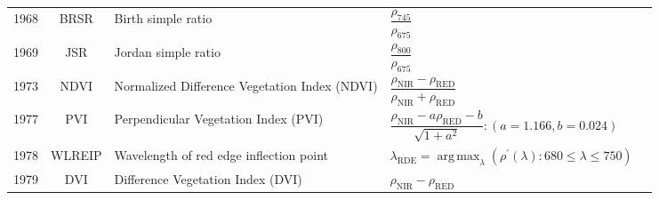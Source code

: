 \documentclass[10pt]{article}
\DeclareMathOperator{\argmax}{arg\,max}
\begin{document}
\begin{ThreePartTable}
\begin{longtable}{c c m{2.80in} M{2.80in} M{1.5in}}
  1968 & BRSR    & Birth simple ratio                                                             & $\dfrac{\rho_{745}}{\rho_{675}}$                                                                                                                                                                                                                                                        & \citet{Birth1968}                                   \\
  1969 & JSR     & Jordan simple ratio                                                            & $\dfrac{\rho_{800}}{\rho_{675}}$                                                                                                                                                                                                                                                        & \citet{Jordan1969}                                  \\
  1973 & NDVI    & Normalized Difference Vegetation Index (NDVI)                                  & $\dfrac{\rho_\text{NIR}-\rho_\text{RED}}{\rho_\text{NIR}+\rho_\text{RED}}$                                                                                                                                                                                                              & \citet{Rouse1973}                                   \\
  1977 & PVI     & Perpendicular Vegetation Index (PVI)                                           & $\dfrac{\rho_\text{NIR}-a\rho_\text{RED}-b}{\sqrt{1+a^2}}:(a=1.166,b=0.024)$                                                                                                                                                                                                            & \citet{Richardson1977,Jackson1980,Huete1984}        \\
  1978 & WLREIP  & Wavelength of red edge inflection point                                        & $\lambda_\text{RDE} = \argmax_\lambda (\rho^\prime(\lambda):680\le\lambda\le750)$                                                                                                                                                                                                       & \citet{Collins1978,Horler1983}                      \\
  1979 & DVI     & Difference Vegetation Index (DVI)                                              & $\rho_\text{NIR}-\rho_\text{RED}$                                                                                                                                                                                                                                                       & \citet{Tucker1979}                                  \\

\end{longtable}
\end{ThreePartTable}
\end{document}
